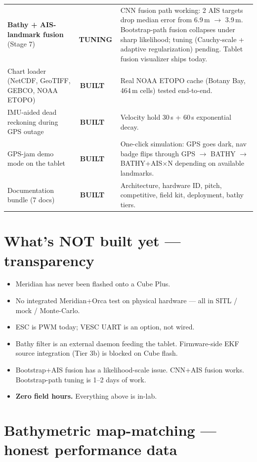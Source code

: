 \documentclass[10pt,a4paper]{article}
\newcommand{\statusbuilt}{{\color{white}\colorbox{mSafe}{\small\bfseries\,BUILT\,}}}
\newcommand{\statustuning}{{\color{white}\colorbox{mWarn}{\small\bfseries\,TUNING\,}}}
\begin{document}
\begin{tabularx}{\textwidth}{@{}l l X@{}}
\textbf{Bathy + AIS-landmark fusion} (Stage 7) & \statustuning & CNN fusion path working: 2 AIS targets drop median error from 6.9\,m $\rightarrow$ 3.9\,m. Bootstrap-path fusion collapses under sharp likelihood; tuning (Cauchy-scale + adaptive regularization) pending. Tablet fusion visualizer ships today. \\
\rowcolor{mRow} Chart loader (NetCDF, GeoTIFF, GEBCO, NOAA ETOPO) & \statusbuilt & Real NOAA ETOPO cache (Botany Bay, 464\,m cells) tested end-to-end. \\
IMU-aided dead reckoning during GPS outage & \statusbuilt & Velocity hold 30\,s + 60\,s exponential decay. \\
\rowcolor{mRow} GPS-jam demo mode on the tablet & \statusbuilt & One-click simulation: GPS goes dark, nav badge flips through GPS $\rightarrow$ BATHY $\rightarrow$ BATHY+AIS$\times$N depending on available landmarks. \\
Documentation bundle (7 docs) & \statusbuilt & Architecture, hardware ID, pitch, competitive, field kit, deployment, bathy tiers. \\
\bottomrule
\end{tabularx}

\section{What's NOT built yet — transparency}
\begin{itemize}
\item Meridian has never been flashed onto a Cube Plus.
\item No integrated Meridian+Orca test on physical hardware — all in SITL / mock / Monte-Carlo.
\item ESC is PWM today; VESC UART is an option, not wired.
\item Bathy filter is an external daemon feeding the tablet. Firmware-side EKF source integration (Tier 3b) is blocked on Cube flash.
\item Bootstrap+AIS fusion has a likelihood-scale issue. CNN+AIS fusion works. Bootstrap-path tuning is 1--2 days of work.
\item \textbf{Zero field hours.} Everything above is in-lab.
\end{itemize}

\pagebreak

\section{Bathymetric map-matching — honest performance data}
\end{document}

